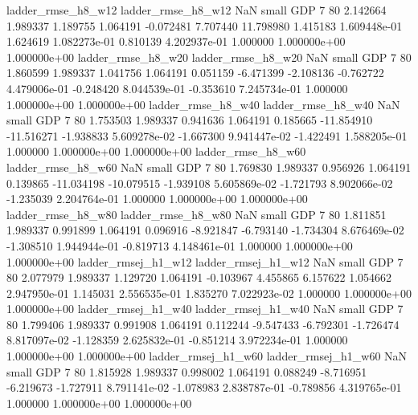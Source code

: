       ladder_rmse_h8_w12       ladder_rmse_h8_w12                   NaN      small      GDP                 7 80 2.142664       1.989337 1.189755       1.064191   -0.072481      7.707440     11.798980     1.415183   1.609448e-01  1.624619 1.082273e-01     0.810139   4.202937e-01            1.000000    1.000000e+00        1.000000e+00
      ladder_rmse_h8_w20       ladder_rmse_h8_w20                   NaN      small      GDP                 7 80 1.860599       1.989337 1.041756       1.064191    0.051159     -6.471399     -2.108136    -0.762722   4.479006e-01 -0.248420 8.044539e-01    -0.353610   7.245734e-01            1.000000    1.000000e+00        1.000000e+00
      ladder_rmse_h8_w40       ladder_rmse_h8_w40                   NaN      small      GDP                 7 80 1.753503       1.989337 0.941636       1.064191    0.185665    -11.854910    -11.516271    -1.938833   5.609278e-02 -1.667300 9.941447e-02    -1.422491   1.588205e-01            1.000000    1.000000e+00        1.000000e+00
      ladder_rmse_h8_w60       ladder_rmse_h8_w60                   NaN      small      GDP                 7 80 1.769830       1.989337 0.956926       1.064191    0.139865    -11.034198    -10.079515    -1.939108   5.605869e-02 -1.721793 8.902066e-02    -1.235039   2.204764e-01            1.000000    1.000000e+00        1.000000e+00
      ladder_rmse_h8_w80       ladder_rmse_h8_w80                   NaN      small      GDP                 7 80 1.811851       1.989337 0.991899       1.064191    0.096916     -8.921847     -6.793140    -1.734304   8.676469e-02 -1.308510 1.944944e-01    -0.819713   4.148461e-01            1.000000    1.000000e+00        1.000000e+00
     ladder_rmsej_h1_w12      ladder_rmsej_h1_w12                   NaN      small      GDP                 7 80 2.077979       1.989337 1.129720       1.064191   -0.103967      4.455865      6.157622     1.054662   2.947950e-01  1.145031 2.556535e-01     1.835270   7.022923e-02            1.000000    1.000000e+00        1.000000e+00
     ladder_rmsej_h1_w40      ladder_rmsej_h1_w40                   NaN      small      GDP                 7 80 1.799406       1.989337 0.991908       1.064191    0.112244     -9.547433     -6.792301    -1.726474   8.817097e-02 -1.128359 2.625832e-01    -0.851214   3.972234e-01            1.000000    1.000000e+00        1.000000e+00
     ladder_rmsej_h1_w60      ladder_rmsej_h1_w60                   NaN      small      GDP                 7 80 1.815928       1.989337 0.998002       1.064191    0.088249     -8.716951     -6.219673    -1.727911   8.791141e-02 -1.078983 2.838787e-01    -0.789856   4.319765e-01            1.000000    1.000000e+00        1.000000e+00
